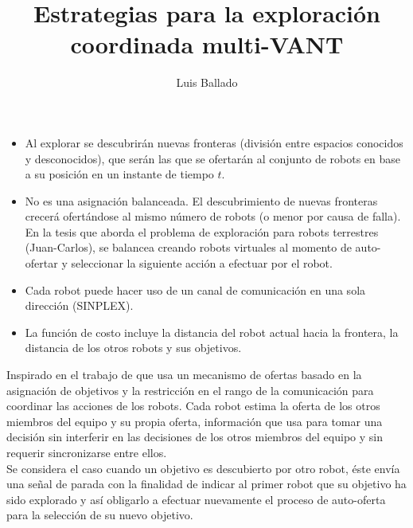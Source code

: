 \documentclass[12pt]{article}
\begin{document}
 
 
\title{Estrategias para la exploración coordinada multi-VANT}%
\author{Luis Ballado} %
 
\maketitle

\begin{itemize}
\item Al explorar se descubrirán nuevas fronteras (división entre espacios conocidos y desconocidos), que serán las que se ofertarán al conjunto de robots en base a su posición en un instante de tiempo $t$.
\item No es una asignación balanceada. El descubrimiento de nuevas fronteras crecerá ofertándose al mismo número de robots (o menor por causa de falla).\\
  En la tesis que aborda el problema de exploración para robots terrestres (Juan-Carlos), se balancea creando robots virtuales al momento de auto-ofertar y seleccionar la siguiente acción a efectuar por el robot.
\item Cada robot puede hacer uso de un canal de comunicación en una sola dirección (SINPLEX).
\item La función de costo incluye la distancia del robot actual hacia la frontera, la distancia de los otros robots y sus objetivos.
\end{itemize}

Inspirado en el trabajo de \citeauthor{LEAL2013}\cite{LEAL2013} que usa un mecanismo de ofertas basado en la asignación de objetivos y la restricción en el rango de la comunicación para coordinar las acciones de los robots. Cada robot estima la oferta de los otros miembros del equipo y su propia oferta, información que usa para tomar una decisión sin interferir en las decisiones de los otros miembros del equipo y sin requerir sincronizarse entre ellos.\\
Se considera el caso cuando un objetivo es descubierto por otro robot, éste envía una señal de parada con la finalidad de indicar al primer robot que su objetivo ha sido explorado y así obligarlo a efectuar nuevamente el proceso de auto-oferta para la selección de su nuevo objetivo.\\
\end{document}
